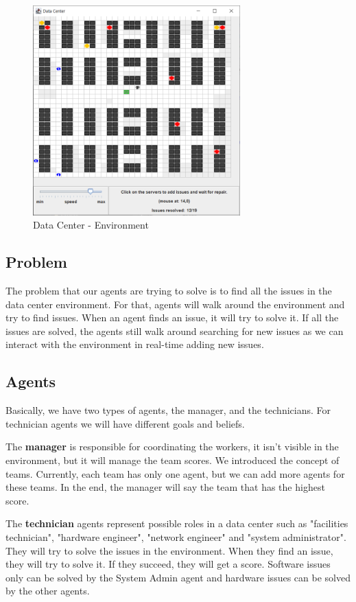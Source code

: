\documentclass[letterpaper]{article}
\begin{document}
\begin{figure}[ht]
    \centering
    \includegraphics[width=8cm]{images/world.png}
    \caption{Data Center - Environment}
    \label{fig:data-center-env}
\end{figure}

\subsection{Problem}

The problem that our agents are trying to solve is to find all the issues in the data center environment. For that, agents will walk around the environment and try to find issues. When an agent finds an issue, it will try to solve it. If all the issues are solved, the agents still walk around searching for new issues as we can interact with the environment in real-time adding new issues.

\subsection{Agents}

Basically, we have two types of agents, the manager, and the technicians. For technician agents we will have different goals and beliefs.

The \textbf{manager} is responsible for coordinating the workers, it isn't visible in the environment, but it will manage the team scores. We introduced the concept of teams. Currently, each team has only one agent, but we can add more agents for these teams. In the end, the manager will say the team that has the highest score.

The \textbf{technician} agents represent possible roles in a data center such as "facilities technician", "hardware engineer", "network engineer" and "system administrator". They will try to solve the issues in the environment. When they find an issue, they will try to solve it. If they succeed, they will get a score. Software issues only can be solved by the System Admin agent and hardware issues can be solved by the other agents.
\end{document}
